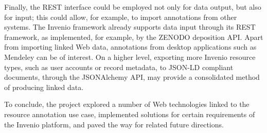 Finally, the REST  interface could be employed not only for data output, but
also for input; this could allow, for example, to import annotations from other
systems. The Invenio framework already supports data input through its REST
framework, as implemented, for example, by the ZENODO deposition API. Apart
from importing linked Web  data, annotations from desktop applications such as
Mendeley can be of interest. On a higher level, exporting more Invenio resource
types, such as user accounts or record metadata, to JSON-LD compliant documents,
through the JSONAlchemy API, may provide a consolidated method of producing
linked data.

To conclude, the project explored a number of Web technologies linked to the
resource annotation use case, implemented solutions for certain requirements of
the Invenio platform, and paved the way for related future directions.
